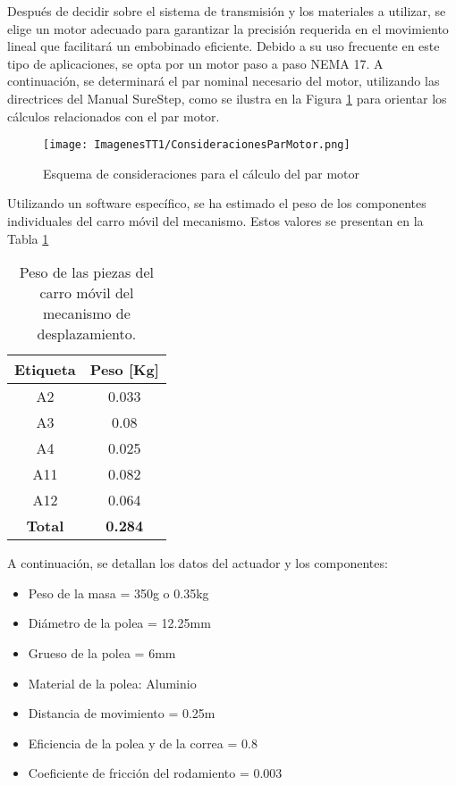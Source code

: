 \documentclass[14pt,oneside]{extarticle} %
\begin{document}
Después de decidir sobre el sistema de transmisión y los materiales a utilizar, se elige un motor adecuado para garantizar la precisión requerida en el movimiento lineal que facilitará un embobinado eficiente. Debido a su uso frecuente en este tipo de aplicaciones, se opta por un motor paso a paso NEMA 17. A continuación, se determinará el par nominal necesario del motor, utilizando las directrices del Manual SureStep, como se ilustra en la Figura \ref{fig:ConsideracionesParMotor} para orientar los cálculos relacionados con el par motor.

\begin{figure}[H]
    \centering
    \texttt{[image: ImagenesTT1/ConsideracionesParMotor.png]}
    \caption{Esquema de consideraciones para el cálculo del par motor \cite{extrusoraPLA}}
    \label{fig:ConsideracionesParMotor}
\end{figure}

\vspace{-0.5cm}

Utilizando un software específico, se ha estimado el peso de los componentes individuales del carro móvil del mecanismo. Estos valores se presentan en la Tabla \ref{tab:peso-piezas-carro-movil}

\begin{table}[h]
\centering
\begin{tabular}{|c|c|}
\hline
\textbf{Etiqueta} & \textbf{Peso [Kg]} \\ \hline
A2 & 0.033 \\ \hline
A3 & 0.08 \\ \hline
A4 & 0.025 \\ \hline
A11 & 0.082 \\ \hline
A12 & 0.064 \\ \hline
\textbf{Total} & \textbf{0.284} \\ \hline
\end{tabular}
\caption{Peso de las piezas del carro móvil del mecanismo de desplazamiento.}
\label{tab:peso-piezas-carro-movil}
\end{table}

A continuación, se detallan los datos del actuador y los componentes:

\begin{itemize}
    \item Peso de la masa = 350g o 0.35kg
    \item Diámetro de la polea = 12.25mm
    \item Grueso de la polea = 6mm
    \item Material de la polea: Aluminio
    \item Distancia de movimiento = 0.25m
    \item Eficiencia de la polea y de la correa = 0.8
    \item Coeficiente de fricción del rodamiento = 0.003
\end{itemize}
\end{document}
